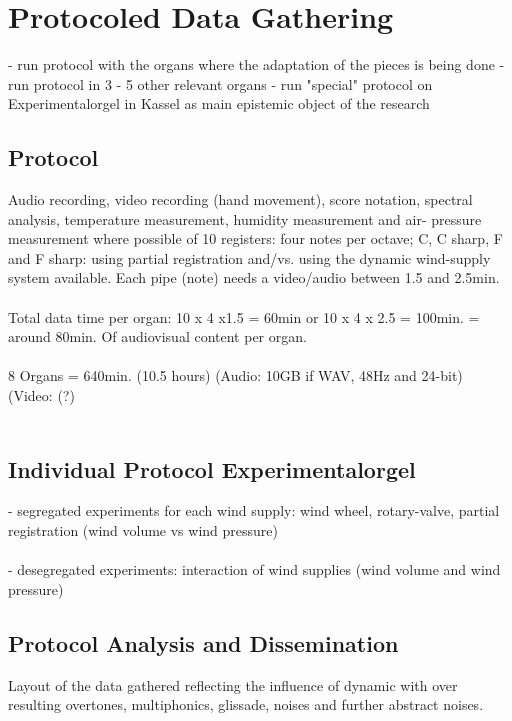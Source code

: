\documentclass[11pt, oneside]{report}   	%
\begin{document}
\section{Protocoled Data Gathering}

- run protocol with the organs where the adaptation of the pieces is being done
- run protocol in 3 - 5 other relevant organs
- run "special" protocol on Experimentalorgel in Kassel as main epistemic object of the research 

\subsection{Protocol} 

Audio recording, video recording (hand movement), score notation, spectral analysis, temperature measurement, humidity measurement and air- pressure measurement where possible  of 10 registers: four notes per octave; C, C sharp, F and F sharp: using partial registration and/vs. using the dynamic wind-supply system available.
Each pipe (note) needs a video/audio between 1.5 and 2.5min. \\
\\
Total data time per organ: 10 x 4 x1.5 = 60min or 10 x 4 x 2.5 = 100min. = around 80min. Of audiovisual content per organ. \\
\\
8 Organs = 640min. (10.5 hours) (Audio: 10GB if WAV, 48Hz and 24-bit) (Video: (?)\\
\\
\subsection{Individual Protocol Experimentalorgel}

- segregated experiments for each wind supply: wind wheel, rotary-valve, partial registration (wind volume vs wind pressure)\\
\\
- desegregated experiments: interaction of wind supplies (wind volume and wind pressure)

\subsection{Protocol Analysis and Dissemination}

Layout of the data gathered reflecting the influence of dynamic with over resulting overtones, multiphonics, glissade, noises and further  abstract noises. 
\end{document}
